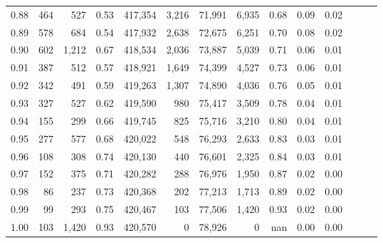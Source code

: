 \begin{tabular}{rrrrrrrrrrrrrr}
0.88 &     464 &    527 &  0.53 &  417,354 &    3,216 &  71,991 &   6,935 &  0.68 &  0.09 &      0.02 \\
0.89 &     578 &    684 &  0.54 &  417,932 &    2,638 &  72,675 &   6,251 &  0.70 &  0.08 &      0.02 \\
0.90 &     602 &  1,212 &  0.67 &  418,534 &    2,036 &  73,887 &   5,039 &  0.71 &  0.06 &      0.01 \\
0.91 &     387 &    512 &  0.57 &  418,921 &    1,649 &  74,399 &   4,527 &  0.73 &  0.06 &      0.01 \\
0.92 &     342 &    491 &  0.59 &  419,263 &    1,307 &  74,890 &   4,036 &  0.76 &  0.05 &      0.01 \\
0.93 &     327 &    527 &  0.62 &  419,590 &      980 &  75,417 &   3,509 &  0.78 &  0.04 &      0.01 \\
0.94 &     155 &    299 &  0.66 &  419,745 &      825 &  75,716 &   3,210 &  0.80 &  0.04 &      0.01 \\
0.95 &     277 &    577 &  0.68 &  420,022 &      548 &  76,293 &   2,633 &  0.83 &  0.03 &      0.01 \\
0.96 &     108 &    308 &  0.74 &  420,130 &      440 &  76,601 &   2,325 &  0.84 &  0.03 &      0.01 \\
0.97 &     152 &    375 &  0.71 &  420,282 &      288 &  76,976 &   1,950 &  0.87 &  0.02 &      0.00 \\
0.98 &      86 &    237 &  0.73 &  420,368 &      202 &  77,213 &   1,713 &  0.89 &  0.02 &      0.00 \\
0.99 &      99 &    293 &  0.75 &  420,467 &      103 &  77,506 &   1,420 &  0.93 &  0.02 &      0.00 \\
1.00 &     103 &  1,420 &  0.93 &  420,570 &        0 &  78,926 &       0 &   nan &  0.00 &      0.00 \\
\bottomrule
\end{tabular}
